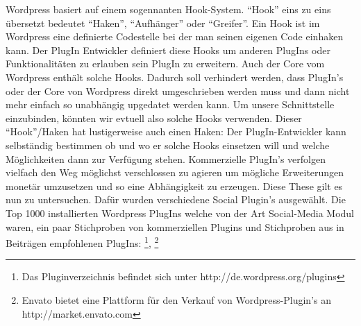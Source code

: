 Wordpress basiert auf einem sogennanten Hook-System. ``Hook'' eins zu
eins übersetzt bedeutet ``Haken'', ``Aufhänger'' oder ``Greifer''. Ein
Hook ist im Wordpress eine definierte Codestelle bei der man seinen
eigenen Code einhaken kann. Der PlugIn Entwickler definiert diese Hooks
um anderen PlugIns oder Funktionalitäten zu erlauben sein PlugIn zu
erweitern. Auch der Core vom Wordpress enthält solche Hooks. Dadurch
soll verhindert werden, dass PlugIn's oder der Core von Wordpress direkt
umgeschrieben werden muss und dann nicht mehr einfach so unabhängig
upgedatet werden kann. Um unsere Schnittstelle einzubinden, könnten wir
evtuell also solche Hooks verwenden. Dieser ``Hook''/Haken hat
lustigerweise auch einen Haken: Der PlugIn-Entwickler kann selbständig
bestimmen ob und wo er solche Hooks einsetzen will und welche
Möglichkeiten dann zur Verfügung stehen. Kommerzielle PlugIn's verfolgen
vielfach den Weg möglichst verschlossen zu agieren um mögliche
Erweiterungen monetär umzusetzen und so eine Abhängigkeit zu erzeugen.
Diese These gilt es nun zu untersuchen. Dafür wurden verschiedene Social
Plugin's ausgewählt. Die Top 1000 installierten Wordpress PlugIns welche
von der Art Social-Media Modul waren, ein paar Stichproben von
kommerziellen Plugins und Stichproben aus in Beiträgen empfohlenen
PlugIns: \footnote{Das Pluginverzeichnis befindet sich unter
  http://de.wordpress.org/plugins}, \footnote{Envato bietet eine
  Plattform für den Verkauf von Wordpress-Plugin's an
  http://market.envato.com}

